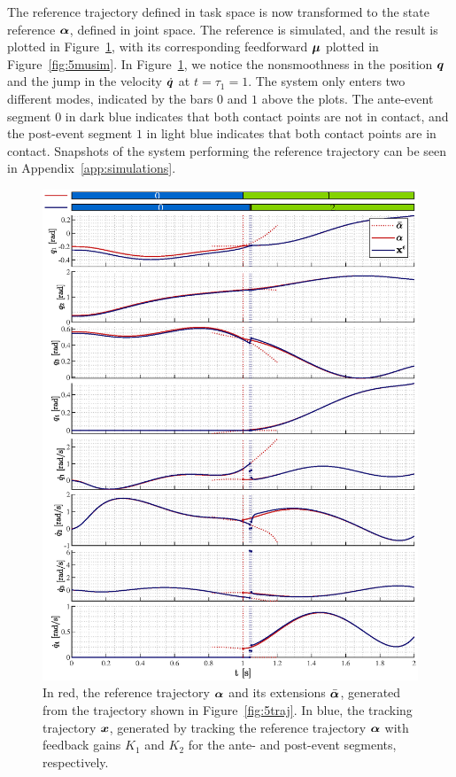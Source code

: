 \documentclass[../DC2019003Bouma.tex]{subfiles}
\begin{document}
The reference trajectory defined in task space is now transformed to the state reference $\boldsymbol{\alpha}$, defined in joint space. The reference is simulated, and the result is plotted in Figure~\ref{fig:5alphasim}, with its corresponding feedforward $\boldsymbol{\mu}$ plotted in Figure~\ref{fig:5musim}. In Figure~\ref{fig:5alphasim}, we notice the nonsmoothness in the position ${\boldsymbol{q}}$ and the jump in the velocity $\dot{{\boldsymbol{q}}}$ at $t=\tau_1=1$. The system only enters two different modes, indicated by the bars $0$ and $1$ above the plots. The ante-event segment $0$ in dark blue indicates that both contact points are not in contact, and the post-event segment $1$ in light blue indicates that both contact points are in contact. Snapshots of the system performing the reference trajectory can be seen in Appendix~\ref{app:simulations}.
\begin{figure}[bt!]
\centering
\includegraphics[width=\textwidth]{allstates.eps}
\caption{In red, the reference trajectory $\boldsymbol{\alpha}$ and its extensions $\bar{\boldsymbol{\alpha}}$, generated from the trajectory shown in Figure~\ref{fig:5traj}. In blue, the tracking trajectory ${\boldsymbol{x}}$, generated by tracking the reference trajectory $\boldsymbol{\alpha}$ with feedback gains $K_1$ and $K_2$ for the ante- and post-event segments, respectively.}\label{fig:5alphasim}
\end{figure}
\end{document}
